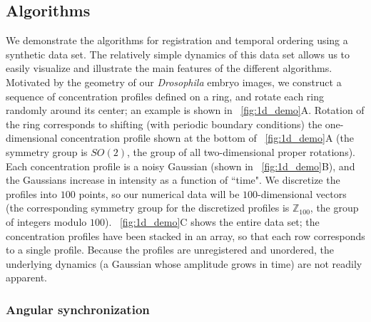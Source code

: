 \subsection{Algorithms}

We demonstrate the algorithms for registration and temporal ordering using a synthetic data set.
%
The relatively simple dynamics of this data set allows us to easily visualize and illustrate the main features of the different algorithms.
%
Motivated by the geometry of our {\em Drosophila} embryo images, we construct a sequence of concentration profiles defined on a ring, and rotate each ring randomly around its center; an example is shown in \fig~\ref{fig:1d_demo}A.
%
Rotation of the ring corresponds to shifting (with periodic boundary conditions) the one-dimensional concentration profile shown at the bottom of \fig~\ref{fig:1d_demo}A (the symmetry group is $SO(2)$, the group of all two-dimensional proper rotations).
%
Each concentration profile is a noisy Gaussian (shown in \fig~\ref{fig:1d_demo}B), and the Gaussians increase in intensity as a function of ``time".
%
We discretize the profiles into $100$ points, so our numerical data will be $100$-dimensional vectors (the corresponding symmetry group for the discretized profiles is $\mathbb{Z}_{100}$, the group of integers modulo $100$).
%
\fig~\ref{fig:1d_demo}C shows the entire data set; the concentration profiles have been stacked in an array, so that each row corresponds to a single profile.
%
Because the profiles are unregistered and unordered, the underlying dynamics (a Gaussian whose amplitude grows in time) are not readily apparent.



\subsubsection{Angular synchronization \citep{singer2011angular}}

